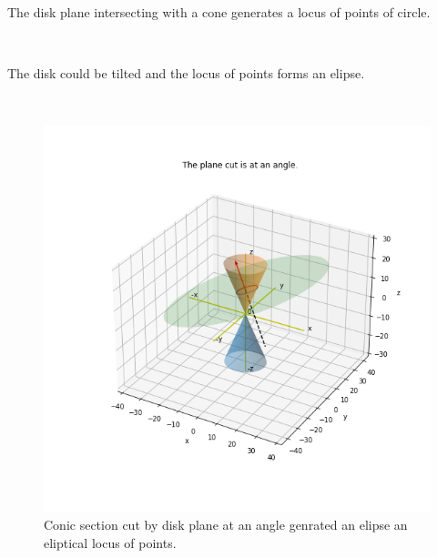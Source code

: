 \documentclass[10pt,a4paper,leqno]{article}
\begin{document}
\begin{CJK*}{UTF8}{gbsn}
\noindent The disk plane intersecting with a cone generates a locus of points of     circle.
 \par \ \par\noindent The disk could be tilted and the locus of points forms an elipse.
 \par \ \par\begin{figure}[H]
\centering\includegraphics[width=1\linewidth,height=0.3\textheight]{Data/fgr04.png}
\caption{Conic section cut by disk plane at an angle genrated an elipse an eliptical locus of points.}
\label{fig:Data/fgr04.png}
\end{figure}


\end{CJK*}
\end{document}
